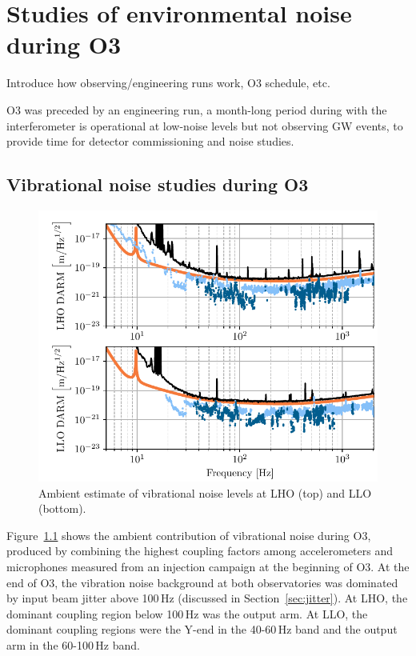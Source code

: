 \chapter{Studies of environmental noise during O3}

{\color{red}
Introduce how observing/engineering runs work, O3 schedule, etc.}

\ac{O3} was preceded by an engineering run, a month-long period during with the interferometer is operational at low-noise levels but not observing \ac{GW} events, to provide time for detector commissioning and noise studies.

\section{Vibrational noise studies during O3}\label{sec:noise-vib}

\begin{figure}[h!]
	\centering
	\includegraphics[width=\textwidth]{figures/ambient_vib.pdf}
	\caption{
		Ambient estimate of vibrational noise levels at LHO (top) and LLO (bottom).}
	\label{fig:ambient-vib}
\end{figure}

Figure~\ref{fig:ambient-vib} shows the ambient contribution of vibrational noise during \ac{O3}, produced by combining the highest coupling factors among accelerometers and microphones measured from an injection campaign at the beginning of \ac{O3}.
At the end of \ac{O3}, the vibration noise background at both observatories was dominated by input beam jitter above 100\,Hz (discussed in Section~\ref{sec:jitter}).
At \ac{LHO},  the dominant coupling region below 100\,Hz was the output arm.
At \ac{LLO}, the dominant coupling regions were the Y-end in the 40-60\,Hz band and the output arm in the 60-100\,Hz band.

